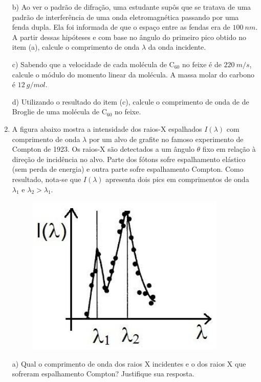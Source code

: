 \begin{enumerate}[start=1,label={\bfseries Q\arabic*.}]
  b) Ao ver o padrão de difração, uma estudante supôs que se tratava de uma padrão de interferência de uma onda eletromagnética passando por uma fenda dupla. Ela foi informada de que o espaço entre as fendas era de $100\ nm$. A partir dessas hipóteses e com base no ângulo do primeiro pico obtido no item (a), calcule o comprimento de onda $\lambda$ da onda incidente.

  \resposta

  c) Sabendo que a velocidade de cada molécula de $\mbox{C}_{60}$ no feixe é de $220\ m/s$, calcule o módulo do momento linear da molécula. A massa molar do carbono é $12 \ g/mol$.

  \resposta

  d) Utilizando o resultado do item (c), calcule o comprimento de onda de de Broglie de uma molécula de $\mbox{C}_{60}$ no feixe.

  \resposta




\item A figura abaixo mostra a intensidade dos raios-X espalhados $I(\lambda)$ com comprimento de onda $\lambda$ por um alvo de grafite no famoso experimento de Compton de 1923. Os raios-X são detectados a um ângulo $\theta$ fixo em relação à direção de incidência no alvo. Parte dos fótons sofre espalhamento elástico (sem perda de energia) e outra parte sofre espalhamento Compton. Como resultado, nota-se que $I(\lambda)$ apresenta dois pics em comprimentos de onda $\lambda_{1}$ e $\lambda_{2} > \lambda_{1}$.

\begin{figure}[H]
  \centering
  \includegraphics[scale=0.7]{moderna-img/raiosx}
\end{figure}


  a) Qual o comprimento de onda dos raios X incidentes e o dos raios X que sofreram espalhamento Compton? Justifique sua resposta.


\end{enumerate}

